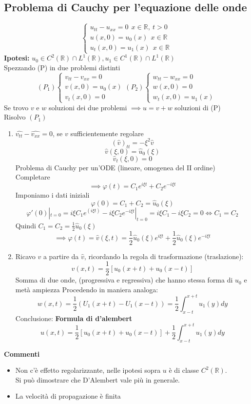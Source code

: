 \documentclass[a4paper]{article}
\newcommand{\R}{\mathbb{R}}
\begin{document}
\subsection{Problema di Cauchy per l'equazione delle onde}
\[\begin{cases}
	u_{t t}-u_{x x}=0\ \ x\in \R,\ t>0\\
	u(x,0)=u_0(x)\ \ x\in \R
	\\u_t(x,0)=u_1(x)\ \ x\in \R
\end{cases}\]
\textbf{Ipotesi:} $u_0\in C^2(\R)\cap L^{1}(\R),u_1\in C^1(\R)\cap L^{1}(\R)$
\\Spezzando (P) in due problemi distinti
\[(P_1) \begin{cases}
	v_{t t}-v_{x x}=0\\
	v(x,0)=u_0(x)\\
	v_t(x,0)=0
\end{cases}
(P_2) \begin{cases}
	w_{t t}-w_{x x}=0\\
	w(x,0)=0\\
	w_t(x,0)=u_1(x)
\end{cases}\]
Se trovo $v$ e $w$ soluzioni dei due problemi $\implies u=v+w$ soluzioni di (P)
\\Risolvo $(P_1)$ 
\begin{enumerate}
	\item $\widehat{v_{t t}}-\widehat{v_{x x}}=0$, se $v$ sufficientemente regolare
		\[(\hat{v})_{t t}=-\xi^2 \hat{v}\]
		\[\hat{v}(\xi,0)=\hat{u}_0(\xi)\]
		\[\hat{v}_t(\xi,0)=0\]
		Problema di Cauchy per un'ODE (lineare, omogenea del II ordine)
		Completare
		\[\implies \varphi(t)=C_1e^{i\xi t}+C_2e^{-i\xi t}\]
		Imponiamo i dati iniziali 
		\[\varphi(0)=C_1+C_2=\hat{u}_0(\xi)\]
		\[\varphi'(0)|_{t=0}=i\xi C_1e^{(i\xi t)}-i\xi C_2e^{-i\xi t}|_{t=0}=i\xi C_1-i\xi C_2=0 \iff C_1=C_2\]
		Quindi $C_1=C_2=\frac{1}{2}\hat{u}_0(\xi)$ 
		\[\implies \varphi(t)=\hat{v}(\xi,t)=\frac{1}{2}\hat{u}_0(\xi)e^{i\xi t}+\frac{1}{2}\hat{u}_0(\xi)e^{-i\xi t}\]
	\item Ricavo $v$ a partire da $\hat{v}$, ricordando la regola di trasformazione (traslazione):
		\[v(x,t)=\frac{1}{2}[u_0(x+t)+u_0(x-t)]\]
		Somma di due onde, (progressiva e regressiva) che hanno stessa forma di $u_0$ e metà ampiezza
		Procedendo in maniera analoga:
		\[w(x,t)=\frac{1}{2}(U_1(x+t)-U_1(x-t))=\frac{1}{2}\int_{x-t}^{x+t} u_1(y)dy\]
		Conclusione: \textbf{Formula di d'alembert}
		\[u(x,t)=\frac{1}{2}[u_0(x+t)+u_0(x-t)]+\frac{1}{2} \int_{x-t}^{x+t} u_1(y)dy\]


\end{enumerate}
\textbf{Commenti} 
\begin{itemize}
	\item Non c'è effetto regolarizzante, nelle ipotesi sopra $u$ è di classe $C^2(\R)$.
		\\Si può dimostrare che D'Alembert vale più in generale.
	\item La velocità di propagazione è finita


\end{itemize}
\end{document}
